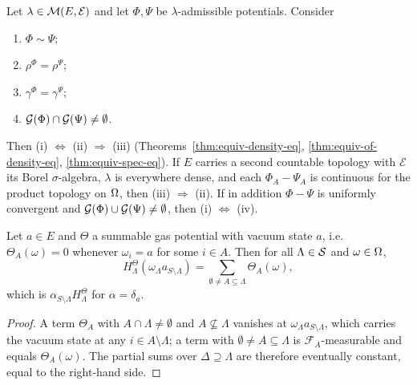 \begin{theorem}[Georgii (2.34)]
    \label{thm:equiv-tfae}
    \leanok

    Let $\lambda \in \mathcal{M}(E,\mathcal{E})$ and let $\Phi, \Psi$ be $\lambda$-admissible
    potentials. Consider
    \begin{enumerate}
        \item[(i)] $\Phi \sim \Psi$;
        \item[(ii)] $\rho^\Phi = \rho^\Psi$;
        \item[(iii)] $\gamma^\Phi = \gamma^\Psi$;
        \item[(iv)] $\mathcal{G}(\Phi) \cap \mathcal{G}(\Psi) \neq \emptyset$.
    \end{enumerate}
    Then (i) $\Leftrightarrow$ (ii) $\Rightarrow$ (iii)
    (Theorems~\ref{thm:equiv-density-eq}, \ref{thm:equiv-of-density-eq},
    \ref{thm:equiv-spec-eq}). If $E$ carries a second countable topology with $\mathcal{E}$ its
    Borel $\sigma$-algebra, $\lambda$ is everywhere dense, and each $\Phi_A - \Psi_A$ is
    continuous for the product topology on $\Omega$, then (iii) $\Rightarrow$ (ii). If in addition
    $\Phi - \Psi$ is uniformly convergent and $\mathcal{G}(\Phi) \cup \mathcal{G}(\Psi) \neq \emptyset$,
    then (i) $\Leftrightarrow$ (iv).
\end{theorem}

\begin{lemma}[Georgii (2.36) for $\alpha = \delta_a$]
    \label{lem:equiv-vacuum-hamiltonian}
    \leanok

    Let $a \in E$ and $\Theta$ a summable gas potential with vacuum state $a$, i.e.\
    $\Theta_A(\omega) = 0$ whenever $\omega_i = a$ for some $i \in A$. Then for all
    $\Lambda \in \mathcal{S}$ and $\omega \in \Omega$,
    \[ H_\Lambda^{\Theta}(\omega_\Lambda a_{S \setminus \Lambda})
        = \sum_{\emptyset \neq A \subseteq \Lambda} \Theta_A(\omega), \]
    which is $\alpha_{S \setminus \Lambda} H_\Lambda^{\Theta}$ for $\alpha = \delta_a$.
\end{lemma}
\begin{proof}
    \leanok

    A term $\Theta_A$ with $A \cap \Lambda \neq \emptyset$ and $A \not\subseteq \Lambda$ vanishes
    at $\omega_\Lambda a_{S\setminus\Lambda}$, which carries the vacuum state at any
    $i \in A \setminus \Lambda$; a term with $\emptyset \neq A \subseteq \Lambda$ is
    $\mathcal{F}_A$-measurable and equals $\Theta_A(\omega)$. The partial sums over
    $\Delta \supseteq \Lambda$ are therefore eventually constant, equal to the right-hand side.
\end{proof}

